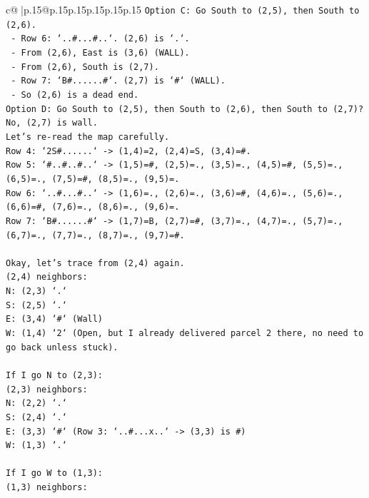 \documentclass{article}
\begin{document}
{\begin{supertabular}{c@{$\;$}|p{.15\linewidth}@{}p{.15\linewidth}p{.15\linewidth}p{.15\linewidth}p{.15\linewidth}p{.15\linewidth}}
{{{\texttt{Option C: Go South to (2,5), then South to (2,6).} \\
\texttt{   {-} Row 6: `..\#...\#..`. (2,6) is `.`.} \\
\texttt{   {-} From (2,6), East is (3,6) (WALL).} \\
\texttt{   {-} From (2,6), South is (2,7).} \\
\texttt{   {-} Row 7: `B\#......\#`. (2,7) is `\#` (WALL).} \\
\texttt{   {-} So (2,6) is a dead end.} \\
\texttt{Option D: Go South to (2,5), then South to (2,6), then South to (2,7)? No, (2,7) is wall.} \\
\texttt{Let's re{-}read the map carefully.} \\
\texttt{Row 4: `2S\#......` {-}> (1,4)=2, (2,4)=S, (3,4)=\#.} \\
\texttt{Row 5: `\#..\#..\#..` {-}> (1,5)=\#, (2,5)=., (3,5)=., (4,5)=\#, (5,5)=., (6,5)=., (7,5)=\#, (8,5)=., (9,5)=.} \\
\texttt{Row 6: `..\#...\#..` {-}> (1,6)=., (2,6)=., (3,6)=\#, (4,6)=., (5,6)=., (6,6)=\#, (7,6)=., (8,6)=., (9,6)=.} \\
\texttt{Row 7: `B\#......\#` {-}> (1,7)=B, (2,7)=\#, (3,7)=., (4,7)=., (5,7)=., (6,7)=., (7,7)=., (8,7)=., (9,7)=\#.} \\
\\ 
\texttt{Okay, let's trace from (2,4) again.} \\
\texttt{(2,4) neighbors:} \\
\texttt{N: (2,3) `.`} \\
\texttt{S: (2,5) `.`} \\
\texttt{E: (3,4) `\#` (Wall)} \\
\texttt{W: (1,4) `2` (Open, but I already delivered parcel 2 there, no need to go back unless stuck).} \\
\\ 
\texttt{If I go N to (2,3):} \\
\texttt{(2,3) neighbors:} \\
\texttt{N: (2,2) `.`} \\
\texttt{S: (2,4) `.`} \\
\texttt{E: (3,3) `\#` (Row 3: `..\#...x..` {-}> (3,3) is \#)} \\
\texttt{W: (1,3) `.`} \\
\\ 
\texttt{If I go W to (1,3):} \\
\texttt{(1,3) neighbors:} \\
}}}
\end{supertabular}}
\end{document}
